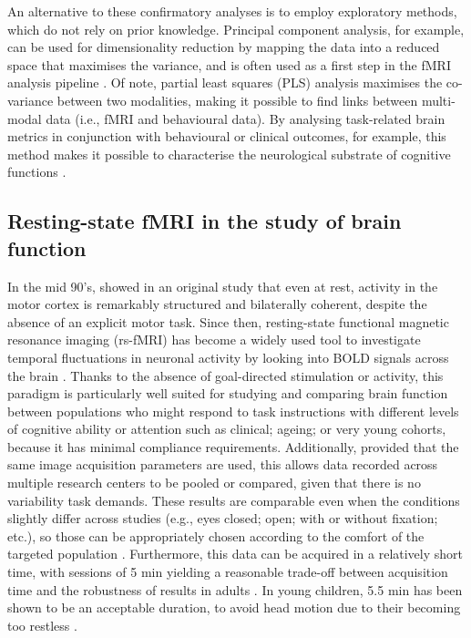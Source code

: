 An alternative to these confirmatory analyses is to employ exploratory methods, which do not rely on prior knowledge. Principal component analysis, for example, can be used for dimensionality reduction by mapping the data into a reduced space that maximises the variance, and is often used as a first step in the fMRI analysis pipeline \citep{Zhong2009}. Of note, partial least squares (PLS) analysis \citep{Randal2004} maximises the co-variance between two modalities, making it possible to find links between multi-modal data (i.e., fMRI and behavioural data). By analysing task-related brain metrics in conjunction with behavioural or clinical outcomes, for example, this method makes it possible to characterise the neurological substrate of cognitive functions \citep{Roberts2017}.





\subsection{Resting-state fMRI in the study of brain function} \label{subsec:ch2_restingState}

In the mid 90's, \citep{Biswal1995} showed in an original study that even at rest, activity in the motor cortex is remarkably structured and bilaterally coherent, despite the absence of an explicit motor task. Since then, resting-state functional magnetic resonance imaging (rs-fMRI) has become a widely used tool to investigate temporal fluctuations in neuronal activity by looking into  BOLD signals across the brain \citep{Damoiseaux2006, Fox2007}. Thanks to the absence of goal-directed stimulation or activity, this paradigm is particularly well suited for studying and comparing brain function between populations who might respond to task instructions with different levels of cognitive ability or attention such as clinical; ageing; or very young cohorts, because it has minimal compliance requirements. Additionally, provided that the same image acquisition parameters are used, this allows data recorded across multiple research centers to be pooled or compared, given that there is no variability task demands. These results are comparable even when the conditions slightly differ across studies (e.g., eyes closed; open; with or without fixation; etc.), so those can be appropriately chosen according to the comfort of the targeted population \citep{Soares2016}. Furthermore, this data can be acquired in a relatively short time, with sessions of 5 min yielding a reasonable trade-off between acquisition time and the robustness of results in adults \citep{VanDijk2010, Whitlow2011}. In young children, 5.5 min has been shown to be an acceptable duration, to avoid head motion due to their becoming too restless \citep{White2014a}. 

